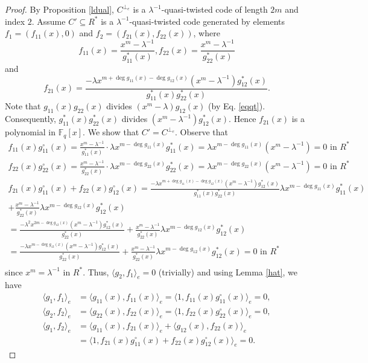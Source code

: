 \documentclass[12 pt]{extarticle}
\numberwithin{equation}{section}
\theoremstyle{definition}
\begin{document}
 \begin{proof}
By Proposition \ref{ldual}, $C^{\perp_e}$ is a $\lambda^{-1}$-quasi-twisted code of length $2m$ and index $2$. Assume $C'\subseteq R^*$ is a $\lambda^{-1}$-quasi-twisted code generated by elements $f_1=(f_{11}(x),0)$ and $f_2=(f_{21}(x),f_{22}(x))$, where  
$$f_{11}(x)=\frac{x^m-\lambda^{-1}}{g^*_{11}(x)},  f_{22}(x)=\frac{x^m-\lambda^{-1}}{g^*_{22}(x)}$$
and  $$f_{21}(x)=\frac{-\lambda x^{m+\deg g_{11}(x)-\deg g_{12}(x)}(x^m-\lambda^{-1})g^*_{12}(x)}{g^*_{11}(x)g^*_{22}(x)}.$$ 
 Note that  $g_{11}(x)g_{22}(x)$ divides  $(x^m-\lambda)g_{12}(x)$ (by Eq. \ref{eqqt}). Consequently, $g^*_{11}(x)g^*_{22}(x)$ divides $(x^m-\lambda^{-1})g^*_{12}(x)$. Hence  $f_{21}(x)$ is a polynomial in $\mathbb{F}_q[x]$.
We show that $C'=C^{\perp_e}$. Observe that \begin{equation*}
    \begin{split}
        f_{11}(x) g_{11}^{\circ}(x)=\frac{x^m-\lambda^{-1}}{g^*_{11}(x)} \cdot \lambda x^{m-\deg g_{11}(x)}g^*_{11}(x)=\lambda x^{m-\deg g_{11}(x)}(x^m-\lambda^{-1}) =0 \text{ in } R^*\\
        f_{22}(x) g_{22}^{\circ}(x)=\frac{x^m-\lambda^{-1}}{g^*_{22}(x)} \cdot \lambda x^{m-\deg g_{22}(x)}g^*_{22}(x)=\lambda x^{m-\deg g_{22}(x)}(x^m-\lambda^{-1}) =0 \text{ in } R^*\\
        f_{21}(x)g^{\circ}_{11}(x)+f_{22}(x)g_{12}^{\circ}(x)=\frac{-\lambda x^{m+\deg g_{11}(x)-\deg g_{12}(x)}(x^m-\lambda^{-1})g^*_{12}(x)}{g^*_{11}(x)g^*_{22}(x)}\lambda x^{m-\deg g_{11}(x)}g^*_{11}(x)\\
        + \frac{x^m-\lambda^{-1}}{g^*_{22}(x)} \lambda x^{m-\deg g_{12}(x)} g^*_{12}(x)\\
        =\frac{-\lambda^2 x^{2m-\deg g_{12}(x)}(x^m-\lambda^{-1})g^*_{12}(x)}{g^*_{22}(x)}
        + \frac{x^m-\lambda^{-1}}{g^*_{22}(x)} \lambda x^{m-\deg g_{12}(x)} g^*_{12}(x)\\
        =\frac{-\lambda x^{m-\deg g_{12}(x)}(x^m-\lambda^{-1})g^*_{12}(x)}{g^*_{22}(x)}
        + \frac{x^m-\lambda^{-1}}{g^*_{22}(x)} \lambda x^{m-\deg g_{12}(x)} g^*_{12}(x)=0 \text{ in } R^* \\
    \end{split}
\end{equation*} 
since  $x^m=\lambda^{-1} \text{ in } R^*$. 
Thus, $\langle g_2, f_1\rangle_e=0$ (trivially) and  using Lemma \ref{hat}, we have 
\begin{equation*}
\begin{split}
        \langle g_1, f_1\rangle_e&= \langle g_{11}(x), f_{11}(x)\rangle_e= \langle 1, f_{11}(x) g_{11}^{\circ}(x)\rangle_e=0,\\
        \langle g_2, f_2\rangle_e&= \langle g_{22}(x), f_{22}(x)\rangle_e= \langle 1, f_{22}(x) g_{22}^{\circ}(x)\rangle_e=0,\\
       \langle g_1,f_2\rangle_e&= \langle  g_{11}(x),f_{21}(x)\rangle_e+\langle  g_{12}(x),f_{22}(x)\rangle_e\\
       &=\langle 1, f_{21}(x)g^{\circ}_{11}(x)+f_{22}(x)g_{12}^{\circ}(x)\rangle_e=0.
        \end{split}
    \end{equation*}


\end{proof}
\end{document}

